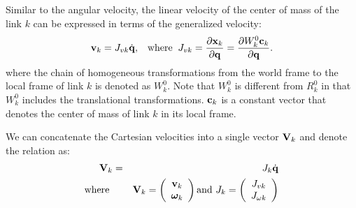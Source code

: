 
Similar to the angular velocity, the linear velocity of the center of mass of the link $k$
can be expressed in terms of the generalized velocity: 
\begin{equation}
\label{eq:linear_velocity_link}
\mathbf{v}_k = J_{vk} \dot{\mathbf{q}}, \;\;\;\mathrm{where}\;\; J_{vk} = \frac{\partial \mathbf{x}_k}{\partial \mathbf{q}}=  \frac{\partial W^0_k
  \mathbf{c}_k}{\partial \mathbf{q}}.
\end{equation}
where the chain of homogeneous transformations from the world frame to the local
frame of link $k$ is denoted as $W^0_k$. Note that $W^0_k$ is
different from $R^0_k$ in that $W^0_k$ includes the translational
transformations. $\mathbf{c}_k$ is a constant vector that denotes the center of mass of link $k$ in
its local frame.

We can concatenate the Cartesian velocities into a single vector $\mathbf{V}_k$ and denote the relation as:
\begin{eqnarray}
\label{eq:vel_relation_link}
\nonumber
\mathbf{V}_k & = & {J}_k \dot{\mathbf{q}}\\
\mbox{where } & & 
\mathbf{V}_k = \left (
\begin{array}{c}
\mathbf{v}_k\\
\bm{\omega}_k
\end{array}
\right ) \mbox{and\ }
{J}_k = \left (
\begin{array}{c}
J_{vk}\\
J_{\omega k}
\end{array}
\right ) 
\end{eqnarray}


